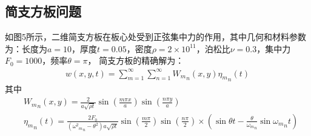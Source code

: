 \documentclass[a4paper]{article}
\begin{document}
\subsection{简支方板问题}
如图5所示，二维简支方板在板心处受到正弦集中力的作用，其中几何和材料参数为：长度为$a=10$，厚度$t=0.05$，密度$\rho=2\times 10^{11}$，泊松比$\nu=0.3$，集中力$F_0=1000$，频率$\theta=\pi$，
简支方板的精确解为：
\begin{equation}
\begin{split}
    w (x,y,t) = \mathop \sum \limits_{m = 1}^\infty  \mathop \sum \limits_{n = 1}^\infty  {W_m}_n(x,y){\eta _m}_n(t) 
\end{split}
\end{equation}
其中
\begin{equation}
\begin{split}
&{W_m}_n(x,y) = \frac{2}{{a\sqrt {\rho t} }}\sin (\frac{{m\pi x}}{a})\sin (\frac{{n\pi y}}{a})\\
&{\eta _m}_n(t) = \frac{{2{F_0}}}{{({\omega ^2}{{_m}_n} - {\theta ^2})a\sqrt {\rho t} }}\sin (\frac{{m\pi }}{2})\sin (\frac{{n\pi }}{2}) \times (\sin \theta t - \frac{\theta }{{{\omega _m}_n}}\sin {\omega _m}_nt)
\end{split}
\end{equation}
\end{document}

